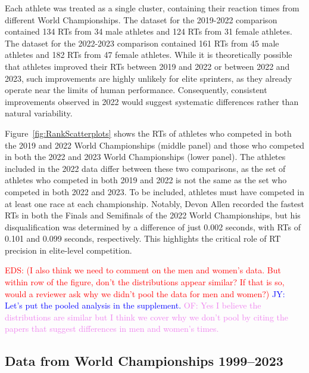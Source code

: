 \documentclass[12pt, letterpaper]{article}
\newcommand{\jy}[1]{\textcolor{blue}{JY: #1}}
\newcommand{\eds}[1]{\textcolor{red}{EDS: (#1)}}
\newcommand{\of}[1]{\textcolor{violet}{OF: #1}}
\begin{document}
Each athlete was treated as a single cluster, containing their reaction
times from different World Championships. The dataset for the 2019-2022
comparison contained 134 RTs from 34 male athletes and 124
RTs from 31 female athletes. The dataset for the 2022-2023
comparison contained 161 RTs from 45 male athletes and 182
RTs from 47 female athletes. While it is theoretically
possible that athletes improved their RTs between 2019 and
2022 or between 2022 and 2023, such improvements are highly unlikely for
elite sprinters, as they already operate near the limits of human
performance. Consequently, consistent improvements observed in 2022
would suggest systematic differences rather than natural variability.


Figure~\ref{fig:RankScatterplots} shows the RTs of athletes
who competed in both the 2019 and 2022 World Championships (middle
panel) and those who competed in both the 2022 and 2023 World
Championships (lower panel). The athletes included in the 2022 data
differ between these two comparisons, as the set of athletes who
competed in both 2019 and 2022 is not the same as the set who competed
in both 2022 and 2023. To be included, athletes must have competed in
at least one race at each championship. Notably, Devon Allen recorded
the fastest RTs in both the Finals and Semifinals of the
2022 World Championships, but his disqualification was determined by a
difference of just 0.002 seconds, with RTs of 0.101 and
0.099 seconds, respectively. This highlights the critical role of
RT precision in elite-level competition.

\eds{I also think we need to comment on the men and women's data. But within row
of the figure, don't the distributions appear similar?  If that is so, would a
reviewer ask why we didn't pool the data for men and women?}
\jy{Let's put the pooled analysis in the supplement.}
\of{Yes I believe the distributions are similar but I think we cover why we don't
pool by citing the papers that suggest differences in men and women's times.}

\subsection{Data from World Championships 1999--2023}
\label{sec:dataworld}
\end{document}
